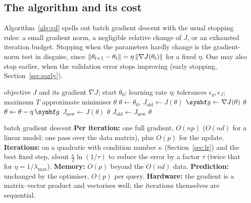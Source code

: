 \documentclass[11pt]{article}
\newcommand{\gvec}{\vect{g}}
\begin{document}
\subsection{The algorithm and its cost}

Algorithm~\ref{alg:gd} spells out batch gradient descent with the usual stopping rules: a small gradient norm, a
negligible relative change of $J$, or an exhausted iteration budget. Stopping when the parameters hardly change is the
gradient-norm test in disguise, since $\left\lVert \theta_{t+1} - \theta_t \right\rVert = \eta\left\lVert \nabla J(\theta_t) \right\rVert$ for a fixed $\eta$. One may also stop earlier, when the validation
error stops improving (early stopping, Section~\ref{sec:early}).

\begin{algorithm}[H]
\caption{Batch gradient descent with stopping rules}\label{alg:gd}
\begin{algorithmic}[1]
\Require objective $J$ and its gradient $\nabla J$; start $\theta_0$; learning rate $\eta$; tolerances $\epsilon_g, \epsilon_J$; maximum $T$
\Ensure approximate minimiser $\theta$
  \State $\theta \gets \theta_0$, \quad $J_{\text{old}} \gets J(\theta)$
    \State $\gvec \gets \nabla J(\theta)$ 
    \If{$\norm{\gvec} < \epsilon_g$} \Return $\theta$ \EndIf
    \State $\theta \gets \theta - \eta\,\gvec$ \Comment{$O(p)$; with constraints, $\Pi(\theta - \eta\gvec)$ (Section~\ref{sec:constraints})}
    \State $J_{\text{new}} \gets J(\theta)$ 
     \Return $\theta$ \EndIf
    \State $J_{\text{old}} \gets J_{\text{new}}$
  \EndFor
  \State \Return $\theta$ 
\EndFunction
\end{algorithmic}
\end{algorithm}

\begin{runtime}{batch gradient descent}
\textbf{Per iteration:} one full gradient, $O(np)$ ($O(nd)$ for a linear model: one pass over the data matrix), plus
$O(p)$ for the update. \textbf{Iterations:} on a quadratic with condition number $\kappa$ (Section~\ref{sec:lr}) and the
best fixed step, about $\frac{\kappa}{2}\ln(1/\tau)$ to reduce the error by a factor $\tau$ (twice that for
$\eta = 1/\lambda_{\max}$). \textbf{Memory:} $O(p)$ beyond the
$O(nd)$ data. \textbf{Prediction:} unchanged by the optimiser, $O(p)$ per query. \textbf{Hardware:} the gradient is a
matrix--vector product and vectorises well; the iterations themselves are sequential.
\end{runtime}
\end{document}
